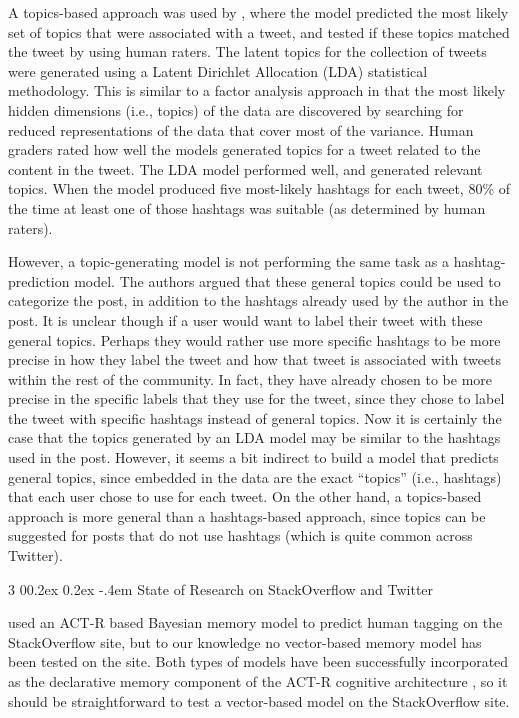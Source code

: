 \documentclass[man,floatsintext,donotrepeattitle]{apa6}
\makeatletter
\renewcommand{\subsubsection}{%
  \@startsection
  {subsubsection}%
  {3}%
  {\parindent}%
  {0\baselineskip \@plus 0.2ex \@minus 0.2ex}%
  {-.4em}%
  {\normalfont\normalsize\bfseries\addperi}}
\makeatother
\begin{document}
A topics-based approach was used by \textcite{Godin2013}, where the model predicted the most likely set of topics that were associated with a tweet, and tested if these topics matched the tweet by using human raters.
The latent topics for the collection of tweets were generated using a Latent Dirichlet Allocation (LDA) statistical methodology.
This is similar to a factor analysis approach in that the most likely hidden dimensions (i.e., topics) of the data are discovered by searching for reduced representations of the data that cover most of the variance. 
Human graders rated how well the models generated topics for a tweet related to the content in the tweet.
The LDA model performed well, and generated relevant topics.
When the model produced five most-likely hashtags for each tweet, 80\% of the time at least one of those hashtags was suitable (as determined by human raters).

However, a topic-generating model is not performing the same task as a hashtag-prediction model.
The authors argued that these general topics could be used to categorize the post, in addition to the hashtags already used by the author in the post.
It is unclear though if a user would want to label their tweet with these general topics.
Perhaps they would rather use more specific hashtags to be more precise in how they label the tweet and how that tweet is associated with tweets within the rest of the community.
In fact, they have already chosen to be more precise in the specific labels that they use for the tweet, since they chose to label the tweet with specific hashtags instead of general topics.
Now it is certainly the case that the topics generated by an LDA model may be similar to the hashtags used in the post.
However, it seems a bit indirect to build a model that predicts general topics, since embedded in the data are the exact ``topics'' (i.e., hashtags) that each user chose to use for each tweet.
On the other hand, a topics-based approach is more general than a hashtags-based approach, since topics can be suggested for posts that do not use hashtags (which is quite common across Twitter).

\subsubsection{State of Research on StackOverflow and Twitter}

\textcite{Stanley2013} used an ACT-R based Bayesian memory model to predict human tagging on the StackOverflow site, but to our knowledge no vector-based memory model has been tested on the site.
Both types of models have been successfully incorporated as the declarative memory component of the ACT-R cognitive architecture \parencite{Rutledge2007},
so it should be straightforward to test a vector-based model on the StackOverflow site.
\end{document}
